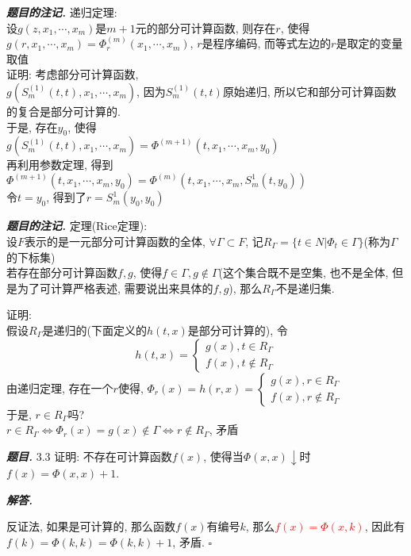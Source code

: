\documentclass[10pt, a4paper, oneside]{ctexart}
\newenvironment{problem}{\begin{framed}\par\noindent\textbf{\textit{题目. }}}{\end{framed}\par}
\newenvironment{solution}{%
  \par\noindent\textbf{\textit{解答. }}\ignorespaces
}{%
  \hfill\ensuremath{\square}\par
}
\newenvironment{note}{\par\noindent\textbf{\textit{题目的注记. }}\ignorespaces}{\par}
\begin{document}
\begin{note}
递归定理:\\
设$g(z,x_1,\cdots,x_m)$是$m+1$元的部分可计算函数, 则存在$r$, 使得$g(r,x_1,\cdots,x_m)=\Phi_r^{(m)}(x_1,\cdots,x_m)$, $r$是程序编码, 而等式左边的$r$是取定的变量取值\\
证明: 考虑部分可计算函数,\\
$g(S_m^{(1)}(t,t),x_1,\cdots,x_m )$, 因为$S_m^{(1)}(t,t)$原始递归, 所以它和部分可计算函数的复合是部分可计算的.\\
于是, 存在$y_0$, 使得\\
$g(S_m^{(1)}(t,t),x_1,\cdots,x_m )=\Phi^{(m+1)}(t,x_1,\cdots,x_m,y_0)$\\
再利用参数定理, 得到$\Phi^{(m+1)}(t,x_1,\cdots,x_m,y_0)=\Phi^{(m)}(t,x_1,\cdots,x_m,S_m^1(t,y_0))$\\
令$t=y_0$, 得到了$r=S_m^1(y_0,y_0)$
\end{note}

\begin{note}
    定理(Rice定理):\\
设$F$表示的是一元部分可计算函数的全体, $\forall \Gamma \subset F$, 记$R_{\Gamma}=\{t\in N |\Phi_t\in \Gamma \}$(称为$\Gamma$的下标集)\\
若存在部分可计算函数$f,g$, 使得$f\in \Gamma, g\notin \Gamma$(这个集合既不是空集, 也不是全体, 但是为了可计算严格表述, 需要说出来具体的$f,g$), 那么$R_{\Gamma}$不是递归集.

证明:\\
假设$R_{\Gamma}$是递归的(下面定义的$h(t,x)$是部分可计算的), 令 
$$h(t,x)=\begin{cases}
    g(x), t\in R_{\Gamma}\\
    f(x), t\notin R_{\Gamma}
\end{cases}$$
由递归定理, 存在一个$r$使得, $\Phi_r(x)=h(r,x)=\begin{cases}
    g(x), r\in R_{\Gamma}\\
    f(x), r\notin R_{\Gamma}
\end{cases}$\\
于是, $r\in R_{\Gamma}$吗?\\
$r\in R_{\Gamma}\iff \Phi_r(x)=g(x)\notin \Gamma \iff r\notin R_{\Gamma}$, 矛盾
\end{note}

\begin{problem}
    3.3 证明: 不存在可计算函数$f(x)$, 使得当$\Phi(x,x)\downarrow$时$f(x) = \Phi(x,x)+1$.
\end{problem}
\begin{solution}
    反证法, 如果是可计算的, 那么函数$f(x)$有编号$k$, 那么\textcolor{red}{$f(x)=\Phi(x,k)$}, 因此有$f(k)=\Phi(k,k)=\Phi(k,k)+1$, 矛盾.
\end{solution}
\end{document}
